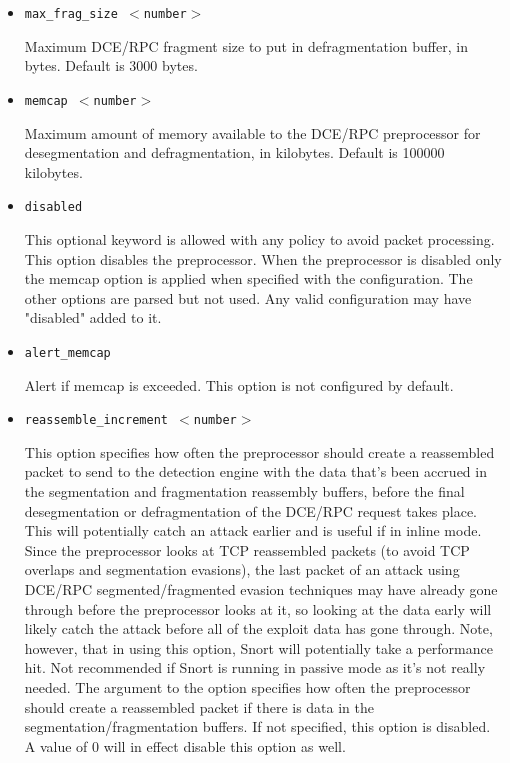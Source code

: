 \documentclass[english]{report}
\begin{document}
\begin{itemize}
\item \texttt{max\_frag\_size $<$number$>$}
\newline

Maximum DCE/RPC fragment size to put in defragmentation buffer, in bytes.
Default is 3000 bytes.

\item \texttt{memcap $<$number$>$}
\newline

Maximum amount of memory available to the DCE/RPC preprocessor for
desegmentation and defragmentation, in kilobytes.  Default is 100000 kilobytes.

\item \texttt{disabled}
\newline

This optional keyword is allowed with any policy to avoid packet processing.
This option disables the preprocessor. When the preprocessor is disabled
only the memcap option is applied when specified with the configuration.
The other options are parsed but not used. Any valid configuration may have
"disabled" added to it.

\item \texttt{alert\_memcap}
\newline

Alert if memcap is exceeded.  This option is not configured by default.

\item \texttt{reassemble\_increment $<$number$>$}
\newline

This option specifies how often the preprocessor should create a reassembled
packet to send to the detection engine with the data that's been accrued in the
segmentation and fragmentation reassembly buffers, before the final
desegmentation or defragmentation of the DCE/RPC request takes place.  This
will potentially catch an attack earlier and is useful if in inline mode.
Since the preprocessor looks at TCP reassembled packets (to avoid TCP overlaps
and segmentation evasions), the last packet of an attack using DCE/RPC
segmented/fragmented evasion techniques may have already gone through before
the preprocessor looks at it, so looking at the data early will likely catch
the attack before all of the exploit data has gone through.  Note, however,
that in using this option, Snort will potentially take a performance hit.  Not
recommended if Snort is running in passive mode as it's not really needed.  The
argument to the option specifies how often the preprocessor should create a
reassembled packet if there is data in the segmentation/fragmentation buffers.
If not specified, this option is disabled.  A value of 0 will in effect disable
this option as well.

\end{itemize}
\end{document}
